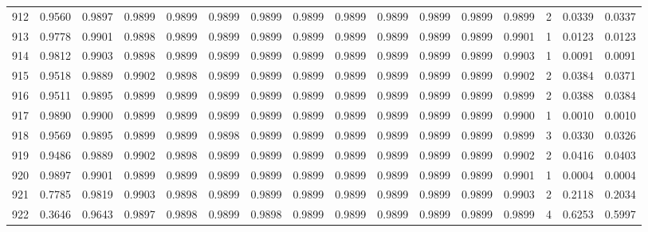 \begin{tabular}{lrrrrrrrrrrrrrrr}
912 &      0.9560 &  0.9897 &  0.9899 &  0.9899 &  0.9899 &  0.9899 &  0.9899 &  0.9899 &  0.9899 &  0.9899 &   0.9899 &     0.9899 &      2 &                    0.0339 &                     0.0337 \\
913 &      0.9778 &  0.9901 &  0.9898 &  0.9899 &  0.9899 &  0.9899 &  0.9899 &  0.9899 &  0.9899 &  0.9899 &   0.9899 &     0.9901 &      1 &                    0.0123 &                     0.0123 \\
914 &      0.9812 &  0.9903 &  0.9898 &  0.9899 &  0.9899 &  0.9899 &  0.9899 &  0.9899 &  0.9899 &  0.9899 &   0.9899 &     0.9903 &      1 &                    0.0091 &                     0.0091 \\
915 &      0.9518 &  0.9889 &  0.9902 &  0.9898 &  0.9899 &  0.9899 &  0.9899 &  0.9899 &  0.9899 &  0.9899 &   0.9899 &     0.9902 &      2 &                    0.0384 &                     0.0371 \\
916 &      0.9511 &  0.9895 &  0.9899 &  0.9899 &  0.9899 &  0.9899 &  0.9899 &  0.9899 &  0.9899 &  0.9899 &   0.9899 &     0.9899 &      2 &                    0.0388 &                     0.0384 \\
917 &      0.9890 &  0.9900 &  0.9899 &  0.9899 &  0.9899 &  0.9899 &  0.9899 &  0.9899 &  0.9899 &  0.9899 &   0.9899 &     0.9900 &      1 &                    0.0010 &                     0.0010 \\
918 &      0.9569 &  0.9895 &  0.9899 &  0.9899 &  0.9898 &  0.9899 &  0.9899 &  0.9899 &  0.9899 &  0.9899 &   0.9899 &     0.9899 &      3 &                    0.0330 &                     0.0326 \\
919 &      0.9486 &  0.9889 &  0.9902 &  0.9898 &  0.9899 &  0.9899 &  0.9899 &  0.9899 &  0.9899 &  0.9899 &   0.9899 &     0.9902 &      2 &                    0.0416 &                     0.0403 \\
920 &      0.9897 &  0.9901 &  0.9899 &  0.9899 &  0.9899 &  0.9899 &  0.9899 &  0.9899 &  0.9899 &  0.9899 &   0.9899 &     0.9901 &      1 &                    0.0004 &                     0.0004 \\
921 &      0.7785 &  0.9819 &  0.9903 &  0.9898 &  0.9899 &  0.9899 &  0.9899 &  0.9899 &  0.9899 &  0.9899 &   0.9899 &     0.9903 &      2 &                    0.2118 &                     0.2034 \\
922 &      0.3646 &  0.9643 &  0.9897 &  0.9898 &  0.9899 &  0.9898 &  0.9899 &  0.9899 &  0.9899 &  0.9899 &   0.9899 &     0.9899 &      4 &                    0.6253 &                     0.5997 \\

\end{tabular}
